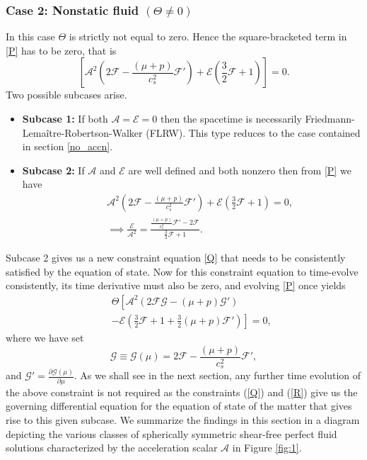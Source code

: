 \documentclass[abstract=on,notitlepage,superscriptaddress,nofootinbib,aps,showpacs,twocolumn,prd]{revtex4}
\newcommand{\0}{^{(0)}}
\newcommand{\1}{^{(1)}}
\newcommand{\2}{^{(2)}}
\newcommand{\3}{{}^{(3)}}
\begin{document}
\subsubsection{Case 2: Nonstatic fluid $\left(\Theta \neq 0\right)$}
In this case $\Theta$ is strictly not equal to zero. Hence the square-bracketed term in \eqref{P} has to be zero, that is
\begin{equation}
    \left[\mathcal{A}^2\left(2\mathcal{F}-\frac{(\mu+p)}{c_s^2}\mathcal{F}'\right)+\mathcal{E}\left(\frac{3}{2}\mathcal{F}+1\right)\right]=0.
\end{equation}
Two possible subcases arise.
\begin{itemize}
	\item \textbf{Subcase 1:} 
	If both $\mathcal{A}=\mathcal{E}=0$ then the spacetime is necessarily Friedmann-Lema\^itre-Robertson-Walker (FLRW). This type reduces to the case contained in section \ref{no_accn}.
	\item \textbf{Subcase 2:} If $\mathcal{A}$ and $\mathcal{E}$ are well defined and both nonzero then from \eqref{P} we have
	 \begin{eqnarray}
	 	&&\mathcal{A}^2\left(2\mathcal{F}-\frac{(\mu+p)}{c_s^2}\mathcal{F}'\right)+\mathcal{E}\left(\frac{3}{2}\mathcal{F}+1\right)= 0, \nonumber \\
	 &&	\implies \frac{\mathcal{E}}{\mathcal{A}^2}= \frac{\frac{(\mu+p)}{c_s^2}\mathcal{F}'-2\mathcal{F}}{\frac{3}{2}\mathcal{F}+1}. \label{Q}
	 \end{eqnarray}
 \end{itemize}
Subcase 2 gives us a new constraint equation \eqref{Q} that needs to be consistently satisfied by the equation of state. Now for this constraint equation to time-evolve consistently, its time derivative must also be zero, and evolving \eqref{P} once yields
\begin{eqnarray} 
 &&\Theta\left[\mathcal{A}^2\left(2\mathcal{F}\mathcal{G}-(\mu+p)\mathcal{G}'\right) \right.
\nonumber\\&& 
\left.  - \mathcal{E}\left(\frac{3}{2}\mathcal{F}+1+\frac{3}{2}(\mu+p)\mathcal{F}'\right)\right]=0, \label{R}
\end{eqnarray}
where we have set
\begin{equation} 
	\mathcal{G} \equiv \mathcal{G}(\mu) = 2\mathcal{F}-\frac{(\mu+p)}{c_s^2}\mathcal{F}',
\end{equation}
and  $\mathcal{G}'=\frac{\partial \mathcal{G}(\mu)}{\partial \mu}$. As we shall see in the next section, any further time evolution of the above constraint is not required as the constraints (\ref{Q}) and (\ref{R}) give us the governing differential equation for the equation of state of the matter that gives rise to this given subcase. We summarize the findings in this section in a diagram depicting the various classes of spherically symmetric shear-free perfect fluid solutions characterized by the acceleration scalar $\mathcal{A}$ in Figure \ref{fig:1}.
 
\end{document}
